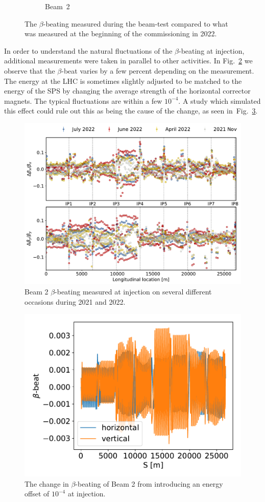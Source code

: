 \documentclass[a4paper]{cernatsnote}
\begin{document}
\begin{figure}[ht]
\begin{subfigure}{.5\textwidth}
  \caption{Beam~2}
\end{subfigure}
\caption{The $\beta$-beating measured during the beam-test compared to what was measured at the beginning of the commissioning in 2022.}
\label{fig:2021_beta_beat_vs_2022}
\end{figure}
In order to understand the natural fluctuations of the $\beta$-beating
at injection, additional measurements were taken in parallel to other activities. In Fig.~\ref{fig:comp_several_beam2} we observe that the $\beta$-beat varies by a few percent depending on the measurement. The energy at the LHC is sometimes slightly adjusted to be matched to the energy of the SPS by changing the average strength of the horizontal corrector magnets. The typical fluctuations are within a few $10^{-4}$. A study which simulated this effect could rule out this as being the cause of the change, as seen in~Fig.~\ref{fig:energy_offset_injection}.

\begin{figure}
  \centering
\includegraphics[width=0.8\linewidth]{plots/beam2/comp_injection_several.pdf}
\caption{Beam 2 $\beta$-beating measured at injection on several different occasions during 2021 and 2022. }
\label{fig:comp_several_beam2}
\end{figure}

\begin{figure}
  \centering
\includegraphics[width=0.8\linewidth]{plots/beam2/injection_energy.pdf}
\caption{The change in $\beta$-beating of Beam 2 from introducing an energy offset of $10^{-4}$ at injection. }
\label{fig:energy_offset_injection}
\end{figure}
\end{document}
